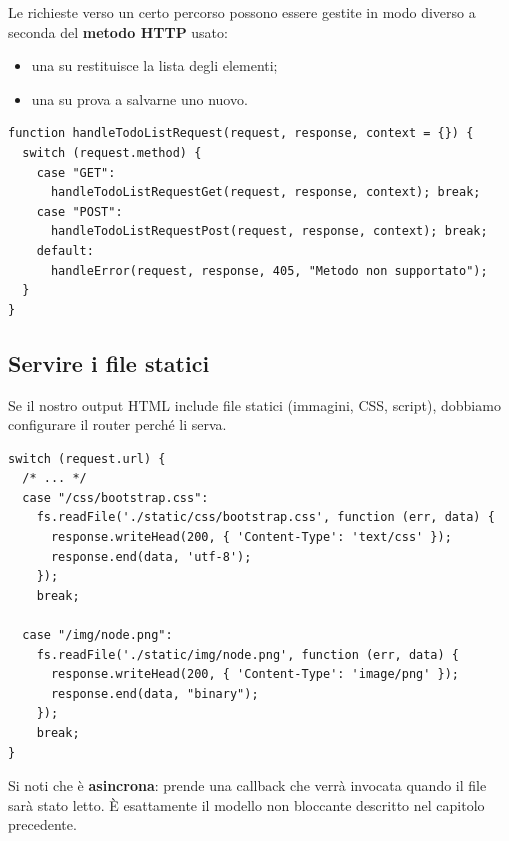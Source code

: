 Le richieste verso un certo percorso possono essere gestite in modo diverso a
seconda del \textbf{metodo HTTP} usato:

\begin{itemize}
  \item una  su  restituisce la lista degli elementi;
  \item una  su  prova a salvarne uno nuovo.
\end{itemize}

\begin{lstlisting}[style=js, name=router.js]
function handleTodoListRequest(request, response, context = {}) {
  switch (request.method) {
    case "GET":
      handleTodoListRequestGet(request, response, context); break;
    case "POST":
      handleTodoListRequestPost(request, response, context); break;
    default:
      handleError(request, response, 405, "Metodo non supportato");
  }
}
\end{lstlisting}


\subsection{Servire i file statici}

Se il nostro output HTML include file statici (immagini, CSS, script), dobbiamo
configurare il router perché li serva.

\begin{lstlisting}[style=js, name=router.js]
switch (request.url) {
  /* ... */
  case "/css/bootstrap.css":
    fs.readFile('./static/css/bootstrap.css', function (err, data) {
      response.writeHead(200, { 'Content-Type': 'text/css' });
      response.end(data, 'utf-8');
    });
    break;

  case "/img/node.png":
    fs.readFile('./static/img/node.png', function (err, data) {
      response.writeHead(200, { 'Content-Type': 'image/png' });
      response.end(data, "binary");
    });
    break;
}
\end{lstlisting}

Si noti che  è \textbf{asincrona}: prende una callback che
verrà invocata quando il file sarà stato letto. È esattamente il modello non
bloccante descritto nel capitolo precedente.

